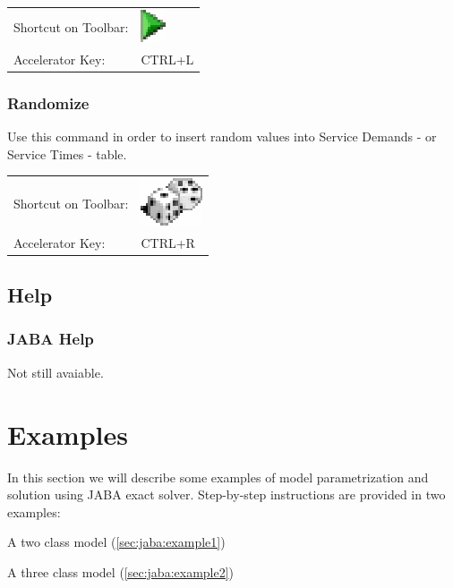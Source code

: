 \noindent
\begin{tabular}{ll}
Shortcut on Toolbar: & \includegraphics[scale=.8]{img/jaba/solve}\\
Accelerator Key: & CTRL+L
\end{tabular}

\subsubsection{Randomize}
Use this command in order to insert random values into Service
Demands - or Service Times - table. 

\noindent
\begin{tabular}{ll}
Shortcut on Toolbar: & \includegraphics[scale=.8]{img/jaba/randomize}\\
Accelerator Key: & CTRL+R
\end{tabular}


\subsection{Help}
\subsubsection{JABA Help}
Not still avaiable.

\section{Examples}
In this section we will describe some examples of model
parametrization and solution using JABA exact solver. Step-by-step
instructions are provided in two examples:
\begin{enumerate*}
\item A two class model
(\autoref{sec:jaba:example1})
\item A three class model
(\autoref{sec:jaba:example2})
\end{enumerate*}

